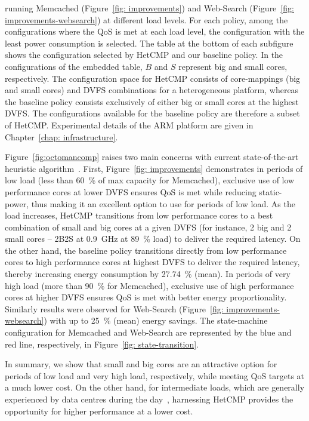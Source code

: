 \noindent running Memcached (Figure~\ref{fig: improvements}) and Web-Search
(Figure~\ref{fig: improvements-websearch}) at different load levels. For each policy,
among the configurations where the QoS is met at each load level, the configuration with
the least power consumption is selected.  The table at the bottom of each subfigure shows
the configuration selected by HetCMP and our baseline policy. In the configurations of the
embedded table, $B$ and $S$ represent big and small cores, respectively. The configuration
space for HetCMP consists of core-mappings (big and small cores) and DVFS combinations for
a heterogeneous platform, whereas the baseline policy consists exclusively of either big
or small cores at the highest DVFS. The configurations available for the baseline policy
are therefore a subset of HetCMP. Experimental details of the ARM platform are given in
Chapter~\ref{chap: infrastructure}.



Figure~\ref{fig:octomancomp} raises two main concerns with current state-of-the-art
heuristic algorithm~\citep{Petrucci2015Octopus-Man:Computers}. First, Figure~\ref{fig:
improvements} demonstrates in periods of low load (less than \SI{60}{\percent} of max
capacity for Memcached), exclusive use of low performance cores at lower DVFS ensures QoS
is met while reducing static-power, thus making it an excellent option to use for periods
of low load. As the load increases, HetCMP transitions from low performance cores to a
best combination of small and big cores at a given DVFS (for instance, 2 big and 2 small
cores -- 2B2S at \SI{0.9}{\giga\hertz} at \SI{89}{\percent} load) to deliver the required
latency.  On the other hand, the baseline policy transitions directly from low performance
cores to high performance cores at highest DVFS to deliver the required latency, thereby
increasing energy consumption by \SI{27.74}{\percent} (mean). In periods of very high load
(more than \SI{90}{\percent} for Memcached), exclusive use of high performance cores at
higher DVFS ensures QoS is met with better energy proportionality.  Similarly results were
observed for Web-Search (Figure~\ref{fig: improvements-websearch}) with up to
\SI{25}{\percent} (mean) energy savings. The state-machine configuration for Memcached and
Web-Search are represented by the blue and red line, respectively, in Figure~\ref{fig:
state-transition}.

In summary, we show that small and big cores are an attractive option for periods of low
load and very high load, respectively, while meeting QoS targets at a much lower cost. On
the other hand, for intermediate loads, which are generally experienced by data centres
during the day~\citep{Vamanan2015TimeTrader:Search}, harnessing HetCMP provides the
opportunity for higher performance at a lower cost.


